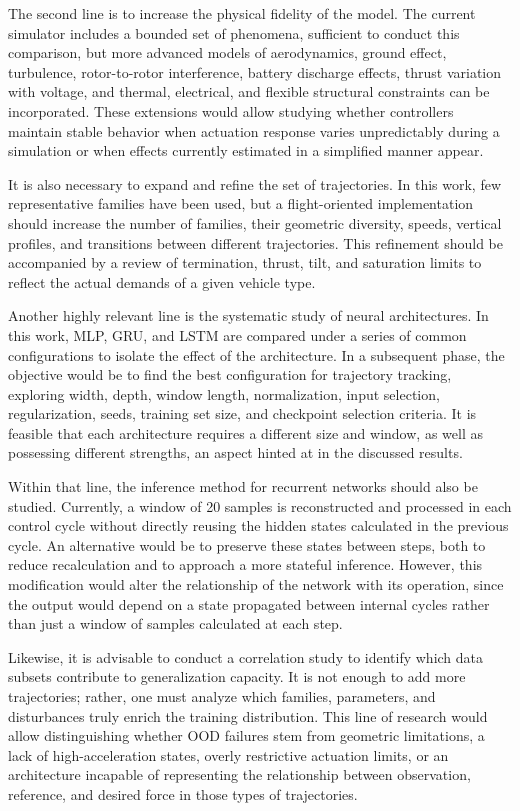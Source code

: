 The second line is to increase the physical fidelity of the model. The current simulator includes a bounded set of phenomena, sufficient to conduct this comparison, but more advanced models of aerodynamics, ground effect, turbulence, rotor-to-rotor interference, battery discharge effects, thrust variation with voltage, and thermal, electrical, and flexible structural constraints can be incorporated. These extensions would allow studying whether controllers maintain stable behavior when actuation response varies unpredictably during a simulation or when effects currently estimated in a simplified manner appear.

It is also necessary to expand and refine the set of trajectories. In this work, few representative families have been used, but a flight-oriented implementation should increase the number of families, their geometric diversity, speeds, vertical profiles, and transitions between different trajectories. This refinement should be accompanied by a review of termination, thrust, tilt, and saturation limits to reflect the actual demands of a given vehicle type.

Another highly relevant line is the systematic study of neural architectures. In this work, MLP, GRU, and LSTM are compared under a series of common configurations to isolate the effect of the architecture. In a subsequent phase, the objective would be to find the best configuration for trajectory tracking, exploring width, depth, window length, normalization, input selection, regularization, seeds, training set size, and checkpoint selection criteria. It is feasible that each architecture requires a different size and window, as well as possessing different strengths, an aspect hinted at in the discussed results.

Within that line, the inference method for recurrent networks should also be studied. Currently, a window of 20 samples is reconstructed and processed in each control cycle without directly reusing the hidden states calculated in the previous cycle. An alternative would be to preserve these states between steps, both to reduce recalculation and to approach a more stateful inference. However, this modification would alter the relationship of the network with its operation, since the output would depend on a state propagated between internal cycles rather than just a window of samples calculated at each step.

Likewise, it is advisable to conduct a correlation study to identify which data subsets contribute to generalization capacity. It is not enough to add more trajectories; rather, one must analyze which families, parameters, and disturbances truly enrich the training distribution. This line of research would allow distinguishing whether OOD failures stem from geometric limitations, a lack of high-acceleration states, overly restrictive actuation limits, or an architecture incapable of representing the relationship between observation, reference, and desired force in those types of trajectories.

